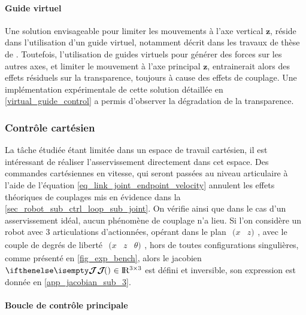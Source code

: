 \documentclass[12pt, a4paper]{article} %
\numberwithin{equation}{section}
\begin{document}
\paragraph{Guide virtuel}

Une solution envisageable pour limiter les mouvements à l'axe vertical $\mathbf{z}$, réside dans l'utilisation d'un guide virtuel, notamment décrit dans les travaux de thèse de \cite{sanchez_restrepo_intuitive_2018}. Toutefois, l'utilisation de guides virtuels pour générer des forces sur les autres axes, et limiter le mouvement à l'axe principal $\mathbf{z}$, entrainerait alors des effets résiduels sur la transparence, toujours à cause des effets de couplage. Une implémentation expérimentale de cette solution détaillée en \cref{virtual_guide_control} a permis d'observer la dégradation de la transparence.
%
\newlineBlank
%


\subsubsection{Contrôle cartésien} \label{sec_robot_sub_ctrl_loop_sub_endpoint}

La tâche étudiée étant limitée dans un espace de travail cartésien, il est intéressant de réaliser l'asservissement directement dans cet espace. Des commandes cartésiennes en vitesse, qui seront passées au niveau articulaire à l'aide de l'équation \cref{eq_link_joint_endpoint_velocity} annulent les effets théoriques de couplages mis en évidence dans la \cref{sec_robot_sub_ctrl_loop_sub_joint}. On vérifie ainsi que dans le cas d'un asservissement idéal, aucun phénomène de couplage n'a lieu.
%
\newlineBlank
%
Si l'on considère un robot avec 3 articulations d'actionnées, opérant dans le plan $ \begin{matrix}( x & z )\end{matrix} $, avec le couple de degrés de liberté $ \begin{matrix}( x & z & \theta )\end{matrix} $, hors de toutes configurations singulières, comme présenté en \cref{fig_exp_bench}, alors le jacobien $\jacobian{}{}{} \in \R^{3\times3}$ est défini et inversible, son expression est donnée en \cref{app_jacobian_sub_3}.
%
\paragraph{Boucle de contrôle principale} \label{sec_robot_sub_ctrl_loop_sub_endpoint_par_main}
\end{document}
